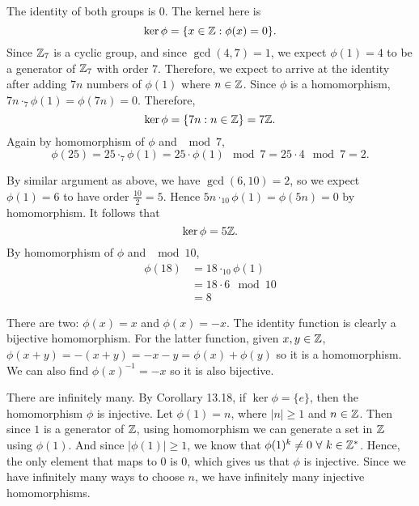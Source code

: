 \documentclass[12pt]{article}
\begin{document}
\begin{problem}[13.17]
The identity of both groups is 0. The kernel here is
\[
\ker \phi = \{x \in \mathbb{Z}: \phi(x) = 0 \} 
.\] 
Since $ \mathbb{Z}_7$ is a cyclic group, and since $ \gcd ( 4,7)=1 $, we expect $ \phi(1)=4 $ to be a generator of $ \mathbb{Z}_7$ with order 7. Therefore, we expect to arrive at the identity after adding $ 7n$ numbers of $ \phi(1)$ where $ n \in \mathbb{Z}$. Since $ \phi$ is a homomorphism, $7n \cdot_7 \phi(1)= \phi(7n) = 0$. Therefore,
\[
\ker \phi = \{7n: n \in \mathbb{Z}\} = 7 \mathbb{Z} 
.\] 
Again by homomorphism of $ \phi$ and $ \mod 7$, 
\[
\phi(25) = 25 \cdot_7 \phi(1) = 25 \cdot \phi(1) \mod 7 = 25 \cdot 4 \mod 7 = 2   
.\] 
\end{problem}

\begin{problem}[13.18]
By similar argument as above, we have $ \gcd ( 6,10) = 2 $, so we expect $ \phi(1)=6 $ to have order $ \frac{10}{2}=5$. Hence $ 5 n \cdot_{10} \phi(1) = \phi(5n) =0 $ by homomorphism. It follows that
\[
\ker \phi = 5 \mathbb{Z} 
.\]
By homomorphism of $ \phi$ and $ \mod 10$,
\begin{align*}
	\phi(18) &= 18 \cdot_{10} \phi(1)  \\
	&= 18 \cdot 6 \mod 10   \\
	&=  8
\end{align*}
\end{problem}

\begin{problem}[13.25]
	There are two: $ \phi(x) =x $ and $ \phi(x) = -x $. The identity function is clearly a bijective homomorphism. For the latter function, given $ x,y \in \mathbb{Z}$, $ \phi(x+y) = -(x+y) = -x - y = \phi(x) + \phi(y) $ so it is a homomorphism. We can also find $ \phi(x)^{-1} = -x $ so it is also bijective.
\end{problem}

\begin{problem}[13.26]
There are infinitely many. By Corollary 13.18, if $ \ker \phi = \{e\} $, then the homomorphism $ \phi $ is injective. Let  $ \phi(1) = n $, where $ |n| \geq 1$ and  $ n \in \mathbb{Z}$. Then since $1$ is a generator of $ \mathbb{Z}$, using homomorphism we can generate a set in $ \mathbb{Z}$ using $ \phi(1) $. And since $ |\phi(1)|\geq 1 $, we know that $ \phi(1)^{k} \neq 0 \ \forall \ k \in \mathbb{Z}^* $. Hence, the only element that maps to 0 is 0, which gives us that $ \phi $ is injective. Since we have infinitely many ways to choose $ n$, we have infinitely many injective homomorphisms. 
\end{problem}
\end{document}
